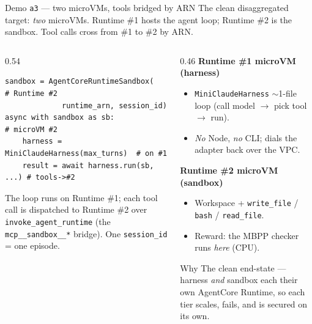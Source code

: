 \documentclass[aspectratio=169]{beamer}
\begin{document}
\begin{frame}[fragile]{Demo \texttt{a3} --- two microVMs, tools bridged by ARN}
  \footnotesize The clean disaggregated target: \emph{two} microVMs. Runtime \#1 hosts the agent loop;
  Runtime \#2 is the sandbox. Tool calls cross from \#1 to \#2 by ARN.
  \begin{columns}[T]
    \begin{column}{0.54\textwidth}
{\scriptsize
\begin{verbatim}
sandbox = AgentCoreRuntimeSandbox(       # Runtime #2
             runtime_arn, session_id)
async with sandbox as sb:              # microVM #2
    harness = MiniClaudeHarness(max_turns)  # on #1
    result = await harness.run(sb, ...) # tools->#2
\end{verbatim}}
      \scriptsize The loop runs on Runtime \#1; each tool call is dispatched to Runtime \#2 over
      \texttt{invoke\_agent\_runtime} (the \texttt{mcp\_\_sandbox\_\_*} bridge). One \texttt{session\_id} = one episode.
    \end{column}
    \begin{column}{0.46\textwidth}
      \footnotesize\textbf{Runtime \#1 microVM (harness)}
      \begin{itemize}\setlength\itemsep{0.05em}
        \item \texttt{MiniClaudeHarness} $\sim$1-file loop (call model $\to$ pick tool $\to$ run).
        \item \emph{No} Node, \emph{no} CLI; dials the adapter back over the VPC.
      \end{itemize}
      \vspace{0.15em}\textbf{Runtime \#2 microVM (sandbox)}
      \begin{itemize}\setlength\itemsep{0.05em}
        \item Workspace + \texttt{write\_file} / \texttt{bash} / \texttt{read\_file}.
        \item Reward: the MBPP checker runs \emph{here} (CPU).
      \end{itemize}
      \begin{block}{Why}
        \scriptsize The clean end-state --- harness \emph{and} sandbox each their own AgentCore Runtime, so each tier scales, fails, and is secured on its own.
      \end{block}
    \end{column}
  \end{columns}
\end{frame}
\end{document}
